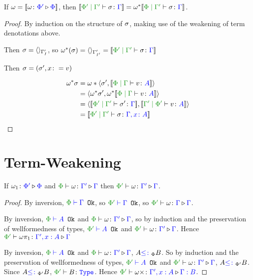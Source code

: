 \documentclass{report}
\begin{document}
\begin{theorem}
    If $\omega = {\bf [\![}\omega \colon {\color{blue}\Phi'} \triangleright {\color {blue} \Phi}{\bf ]\!]}$, then $\deno{\etyperelation{\P'}{\G'}{\si}{\G}} = \w\star\deno{\etyperelation{\P}{\G'}{\si}{\G}}$.
    
\end{theorem}


\begin{framed}
    \begin{proof}
        By induction on the structure of $\sigma$, making use of the weakening of term denotations above.
        
        \case{\tsubnil}
        Then $\sigma = \langle\rangle_{\Gamma'_{I}}$, so $\w\star(\si) = \term{\G'_{I'}} = \deno{\etyperelation{\P'}{\G'}{\si}{\G}}$
        
        \case{\tsubextend}
        Then $\sigma = (\sigma',x\colon= v)$
        
        \begin{align*}
            \w\star\si & = \w*\pr{\si'}{\deno{\gpetyperelation{v}{A}}}\\
            & = \pr{\w\star\si'}{\w\star\deno{\gpetyperelation{v}{A}}}\\
            &=\pr{\deno{\etyperelation{\P'}{\G'}{\si'}{\G}}}{\deno{\etyperelation{\G'}{\P'}{v}{A}}}\\
            &=\deno{\etyperelation{\P'}{\G'}{\si}{\gax}}
        \end{align*}
    \end{proof}
\end{framed}


\section{Term-Weakening}


\begin{theorem}
    If $\omega_1 \colon {\color{blue}\Phi'} \triangleright {\color {blue} \Phi}$ and $\ewrel{\P}{\w}{\G'}{\G}$ then $\ewrel{\P'}{\w}{\G'}{\G}$.
\end{theorem}


\begin{framed}
    \begin{proof}
        \case{\tid}
        By inversion, $\oke{\P}{\G}$, so $\oke{\P'}{\G}$, so $\ewrel{\P'}{\w}{\G}{\G}$.

        \case{\tproject}
        By inversion, $\oke{\P}{A}$ and $\ewrel{\P}{\w}{\G'}{\G}$, so by induction and the preservation of wellformedness of types, $\oke{\P'}{A}$ and $\ewrel{\P'}{\w}{\G'}{\G}$. Hence $\ewrel{\P'}{\w\p}{\G', x: A}{\G}$
        
        \case{\textend}
        By inversion, $\oke{\P}{A}$ and $\ewrel{\P}{\w}{\G'}{\G}$, $A{\color{blue} \leq\colon}_\Phi B$. So by induction and the preservation of wellformedness of types, $\oke{\P'}{A}$ and $\ewrel{\P'}{\w}{\G'}{\G}$, $A{\color{blue} \leq\colon}_{\Phi'} B$. Since $A{\color{blue} \leq\colon}_{\Phi'} B$, $\wellformedt{\P'}{B}$. Hence $\ewrel{\P'}{\w\x}{\G', x: A}{\G: B}$.
    \end{proof}
\end{framed}
\end{document}
